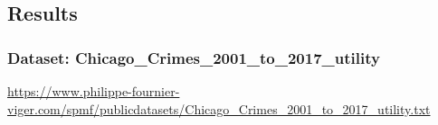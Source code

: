\subsection{Results}


\subsubsection*{Dataset: Chicago\_Crimes\_2001\_to\_2017\_utility}
\url{https://www.philippe-fournier-viger.com/spmf/publicdatasets/Chicago_Crimes_2001_to_2017_utility.txt}

